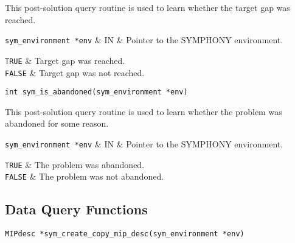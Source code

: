 This post-solution query routine is used to learn whether the target gap was
reached. 

\args

{\tt sym\_environment *env} & IN & Pointer to the SYMPHONY environment.
\et

\returns

{\tt TRUE} & Target gap was reached. \\
{\tt FALSE} & Target gap was not reached.\\
\et

\ed
\vspace{1ex}


\begin{verbatim}
int sym_is_abandoned(sym_environment *env)
\end{verbatim}

\bd
\describe

This post-solution query routine is used to learn whether the problem 
was abandoned for some reason.

\args

{\tt sym\_environment *env} & IN & Pointer to the SYMPHONY environment.
\et

\returns

{\tt TRUE} & The problem was abandoned. \\
{\tt FALSE} & The problem was not abandoned.\\
\et
\ed
\vspace{1ex}

\ed

\newpage

\subsection{Data Query Functions}

\bd


\begin{verbatim}
MIPdesc *sym_create_copy_mip_desc(sym_environment *env)
\end{verbatim}

